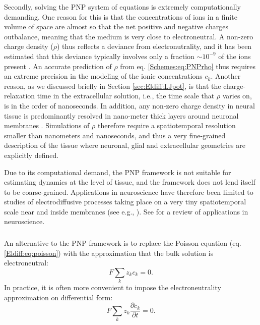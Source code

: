 Secondly, solving the PNP system of equations is extremely computationally demanding. One reason for this is that the concentrations of ions in a finite volume of space are almost so that the net positive and negative charges outbalance, meaning that the medium is very close to electroneutral. A non-zero charge density ($\rho$) thus reflects a deviance from electronutrality, and it has been estimated that this deviance typically involves only a fraction $\sim 10^{-9}$ of the ions present \citep{Aguilella1987}. An accurate prediction of $\rho$ from eq. \ref{Schemes:eq:PNPrho} thus requires an extreme precision in the modeling of the ionic concentrations $c_k$. Another reason, as we discussed briefly in Section \ref{sec:Eldiff:LJpot}, is that the charge-relaxation time in the extracellular solution, i.e., the time scale that $\rho$ varies on, is in the order of nanoseconds. In addition, any non-zero charge density in neural tissue is predominantly resolved in nano-meter thick layers around neuronal membranes \citep{Grodzinsky2011, Gratiy2017}. Simulations of $\rho$ therefore require a spatiotemporal resolution smaller than nanometers and nanoseconds, and thus a very fine-grained description of the tissue where neuronal, glial and extracellular geometries are explicitly defined.

Due to its computational demand, the PNP framework is not suitable for estimating dynamics at the level of tissue, and the framework does not lend itself to be coarse-grained. Applications in neuroscience have therefore been limited to studies of electrodiffusive processes taking place on a very tiny spatiotemporal scale near and inside membranes (see e.g., \citep{Leonetti2004, Lu2007, Lopreore2008, Nanninga2008, Gardner2011, Zheng2011, Pods2013, Gardner2015}). See \citep{Savtchenko2017} for a review of applications in neuroscience.


\subsubsection{}
\label{sec:Schemes:electroneutral}
An alternative to the PNP framework is to replace the Poisson equation (eq. \ref{Eldiff:eq:poisson}) with the approximation that the bulk solution is electroneutral:
\begin{equation}
F \sum_k z_k c_k = 0.
\label{Schemes:eq:electroneutral}
\end{equation}
In practice, it is often more convenient to impose the electroneutrality approximation on differential form:
\begin{equation}
F \sum_k{z_k \frac{\partial c_k}{\partial t}} = 0.
\label{Schemes:eq:electroneutral2}
\end{equation}

